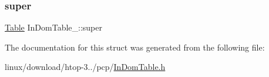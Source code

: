 \mbox{\label{structInDomTable___af01cda0a37d9122921780ca48bcaab3e}} 
\subsubsection{\texorpdfstring{super}{super}}
{\footnotesize\ttfamily \hyperlink{Table_8h_a799795dd983fdfee2e48cc52cdceb05d}{Table} In\+Dom\+Table\+\_\+\+::super}



The documentation for this struct was generated from the following file\+:\begin{DoxyCompactItemize}
\item 
linux/download/htop-\/3../pcp/\hyperlink{InDomTable_8h}{In\+Dom\+Table.\+h}\end{DoxyCompactItemize}
